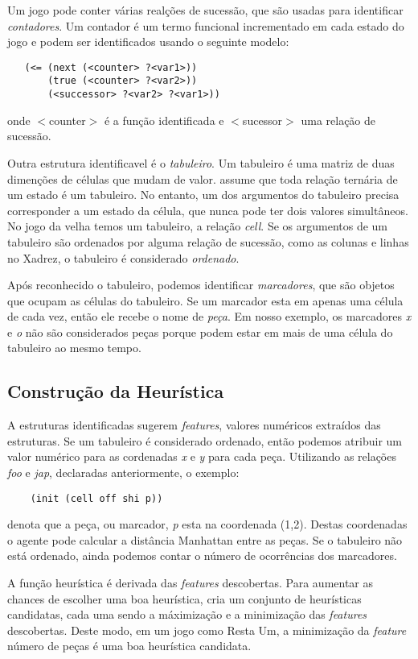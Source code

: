 Um jogo pode conter várias realções de sucessão, que são usadas para identificar
{\it contadores}. Um contador é um termo funcional incrementado em cada estado
do jogo e podem ser identificados usando o seguinte modelo:
\begin{verbatim}
   (<= (next (<counter> ?<var1>))
       (true (<counter> ?<var2>))
       (<successor> ?<var2> ?<var1>))
\end{verbatim}
onde $<$counter$>$ é a função identificada e $<$sucessor$>$ uma relação de sucessão.
 
Outra estrutura identificavel é o {\it tabuleiro}. Um tabuleiro é uma matriz de
duas dimenções de células que mudam de valor. \cite{dresner} assume que toda
relação ternária de um estado é um tabuleiro. No entanto, um dos argumentos do
tabuleiro precisa corresponder a um estado da célula, que nunca pode ter dois
valores simultâneos. No jogo da velha temos um tabuleiro, a relação {\it cell}.
Se os argumentos de um tabuleiro são ordenados por alguma relação de sucessão, como as colunas e linhas no Xadrez, o tabuleiro é considerado {\it ordenado}.
 
Após reconhecido o tabuleiro, podemos identificar {\it marcadores}, que são
objetos que ocupam as células do tabuleiro. Se um marcador esta em apenas uma
célula de cada vez, então ele recebe o nome de {\it peça}. Em nosso exemplo, os
marcadores {\it x} e {\it o} não são considerados peças porque podem estar em
mais de uma célula do tabuleiro ao mesmo tempo.

\subsection{Construção da Heurística}
A estruturas identificadas sugerem {\it features}, valores numéricos extraídos das estruturas. Se um tabuleiro é considerado ordenado, então podemos atribuir um valor numérico para as cordenadas {\it x} e {\it y} para cada peça. Utilizando as relações {\it foo} e {\it jap}, declaradas anteriormente, o exemplo:
\begin{verbatim}
    (init (cell off shi p))    
\end{verbatim}
denota que a peça, ou marcador, {\it p} esta na coordenada (1,2). Destas coordenadas o agente pode calcular a distância Manhattan entre as peças. Se o tabuleiro não está ordenado, ainda podemos contar o número de ocorrências dos marcadores.

A função heurística é derivada das {\it features} descobertas. Para aumentar as chances de escolher uma boa heurística, \cite{dresner} cria um conjunto de heurísticas candidatas, cada uma sendo a máximização e a minimização das {\it features} descobertas. Deste modo, em um jogo como Resta Um, a minimização da {\it feature} número de peças é uma boa heurística candidata.

